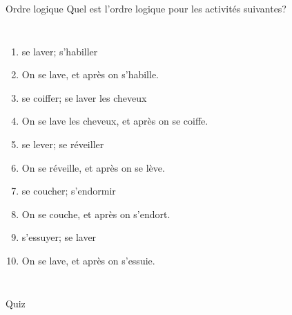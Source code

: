 \documentclass{beamer}
\begin{document}
  \begin{frame}{Ordre logique}
    Quel est l'ordre logique pour les activités suivantes?
    \begin{columns}
        {\scriptsize
        \begin{enumerate}
          \item se laver; s'habiller
          \item<2->[$\to$] On se lave, et après on s'habille.
          \item<3-> se coiffer; se laver les cheveux
          \item<4->[$\to$] On se lave les cheveux, et après on se coiffe.
          \item<5-> se lever; se réveiller
          \item<6->[$\to$] On se réveille, et après on se lève.
          \item<7-> se coucher; s'endormir
          \item<8->[$\to$] On se couche, et après on s'endort.
          \item<9-> s'essuyer; se laver
          \item<10->[$\to$] On se lave, et après on s'essuie.
        \end{enumerate}
        }
        \begin{minipage}[c][0.6\textheight]{\linewidth}
          \begin{center}
          \end{center}
        \end{minipage}
    \end{columns}
  \end{frame}

  \begin{frame}{}
    \begin{center}
      \Large Quiz
    \end{center}
  \end{frame}
\end{document}
